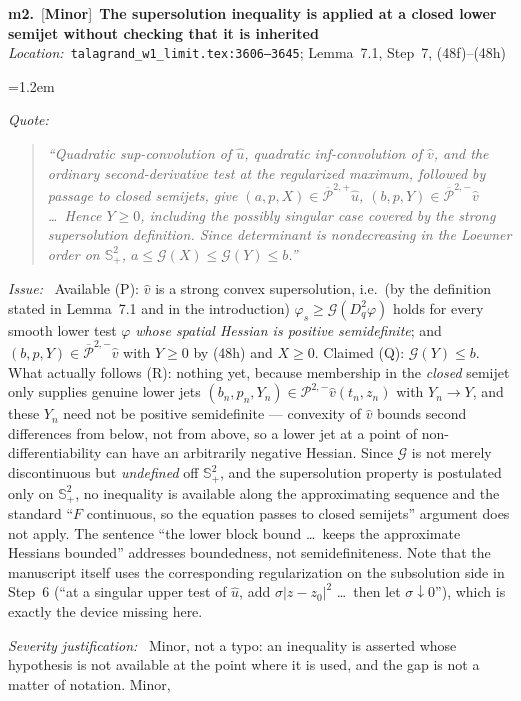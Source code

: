 \documentclass[11pt]{article}
\newcommand{\sevMin}{\textcolor{Goldenrod!60!black}{\textbf{Minor}}}
\newenvironment{finding}[4]{%
  \par\medskip\noindent
  \textbf{#1.}~[#2]~\textbf{#4}\\
  \noindent\textit{Location:}~#3\par\nopagebreak\begin{list}{}{\leftmargin=1.2em\itemsep=2pt\parsep=0pt}}%
  {\end{list}\medskip}
\newcommand{\field}[1]{\item[]\textit{#1:}~}
\newenvironment{mquote}{\begin{quote}\itshape}{\end{quote}}
\newcommand{\Sp}{\mathbb{S}^2_+}
\begin{document}
\begin{finding}{m2}{\sevMin}{\texttt{talagrand\_w1\_limit.tex:3606--3645}; Lemma~7.1, Step~7, (48f)--(48h)}{The supersolution inequality is applied at a closed lower semijet without checking that it is inherited}
  \field{Quote}
  \begin{mquote}
    ``Quadratic sup-convolution of $\widehat u$, quadratic inf-convolution of $\widehat v$, and
    the ordinary second-derivative test at the regularized maximum, followed by passage to closed
    semijets, give $(a,p,X)\in\overline{\mathcal P}^{2,+}\widehat u$,
    $(b,p,Y)\in\overline{\mathcal P}^{2,-}\widehat v$ \dots\ Hence $Y\ge0$, including the possibly
    singular case covered by the strong supersolution definition. Since determinant is
    nondecreasing in the Loewner order on $\Sp$, $a\le\mathcal G(X)\le\mathcal G(Y)\le b$.''
  \end{mquote}
  \field{Issue} Available (P): $\widehat v$ is a strong convex supersolution, i.e.\ (by the
  definition stated in Lemma~7.1 and in the introduction) $\varphi_s\ge\mathcal G(D_q^2\varphi)$
  holds for every smooth lower test $\varphi$ \emph{whose spatial Hessian is positive
  semidefinite}; and $(b,p,Y)\in\overline{\mathcal P}^{2,-}\widehat v$ with $Y\ge0$ by (48h) and
  $X\ge0$. Claimed (Q): $\mathcal G(Y)\le b$. What actually follows (R): nothing yet, because
  membership in the \emph{closed} semijet only supplies genuine lower jets
  $(b_n,p_n,Y_n)\in\mathcal P^{2,-}\widehat v(t_n,z_n)$ with $Y_n\to Y$, and these $Y_n$ need not
  be positive semidefinite --- convexity of $\widehat v$ bounds second differences from below,
  not from above, so a lower jet at a point of non-differentiability can have an arbitrarily
  negative Hessian. Since $\mathcal G$ is not merely discontinuous but \emph{undefined} off
  $\Sp$, and the supersolution property is postulated only on $\Sp$, no inequality is available
  along the approximating sequence and the standard ``$F$ continuous, so the equation passes to
  closed semijets'' argument does not apply. The sentence ``the lower block bound \dots\ keeps
  the approximate Hessians bounded'' addresses boundedness, not semidefiniteness. Note that the
  manuscript itself uses the corresponding regularization on the subsolution side in Step~6
  (``at a singular upper test of $\widehat u$, add $\sigma|z-z_0|^2$ \dots\ then let
  $\sigma\downarrow0$''), which is exactly the device missing here.
  \field{Severity justification} Minor, not a typo: an inequality is asserted whose hypothesis is
  not available at the point where it is used, and the gap is not a matter of notation. Minor,

\end{finding}
\end{document}
